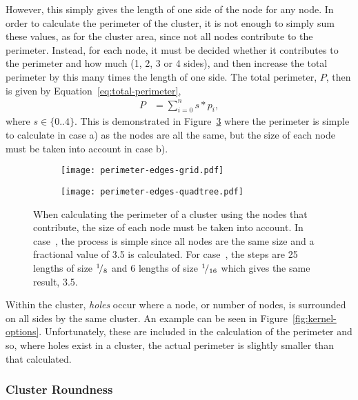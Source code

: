 However, this simply gives the length of one side of the node for any node. In
order to calculate the perimeter of the cluster, it is not enough to simply
sum these values, as for the cluster area, since not all nodes contribute to
the perimeter. Instead, for each node, it must be decided whether it
contributes to the perimeter and how much (1, 2, 3 or 4 sides), and then
increase the total perimeter by this many times the length of one side. The
total perimeter, $P$, then is given by Equation~\ref{eq:total-perimeter},
\begin{align}
	P &= \sum_{i=0}^{n} s * p_i, \label{eq:total-perimeter}
\end{align}
where $s \in \{0..4\}$. This is demonstrated in
Figure~\ref{fig:perimeter-edges} where the perimeter is simple to calculate in
case a) as the nodes are all the same, but the size of each node must be taken
into account in case b).

\begin{figure}[tbhp]
	\centering
	\begin{subfigure}[c]{3.5cm}
		\texttt{[image: perimeter-edges-grid.pdf]}
		\caption{}\label{fig:perimeter-edges-grid.pdf}
	\end{subfigure}%
	\quad
	\begin{subfigure}[c]{3.5cm}
		\texttt{[image: perimeter-edges-quadtree.pdf]}
		\caption{}\label{fig:perimeter-edges-quadtree.pdf}
	\end{subfigure}

	\caption{When calculating the perimeter of a cluster using the nodes that
		contribute, the size of each node must be taken into account. In
		case~, the process is simple since
		all nodes are the same size and a fractional value of 3.5 is
		calculated. For case~, the
		steps are 25 lengths of size ${}^{1}\!/_{8}$ and 6 lengths of size
		${}^{1}\!/_{16}$ which gives the same result, 3.5.}
	\label{fig:perimeter-edges}

\end{figure}

Within the cluster, \emph{holes} occur where a node, or number of nodes, is
surrounded on all sides by the same cluster. An example can be seen in
Figure~\ref{fig:kernel-options}. Unfortunately, these are included in the
calculation of the perimeter and so, where holes exist in a cluster, the actual
perimeter is slightly smaller than that calculated.

\subsubsection{Cluster Roundness}
\label{ssub:Cluster Roundness}

